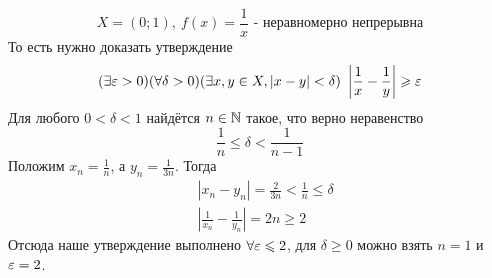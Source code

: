 \begin{example}
	\[
		X = (0; 1),\ f(x) = \frac{1}{x}
		\text{ - неравномерно непрерывна}
	\]
	То есть нужно доказать утверждение
	\[
		(\exists \eps > 0)(\forall \delta > 0)
		(\exists x, y \in X, |x - y| < \delta)\ 
		\left|\frac{1}{x} - \frac{1}{y}\right| \ge \eps
	\]
	Для любого $0 < \delta < 1$ найдётся $n \in \mathbb{N}$ такое,
	что верно неравенство
	\[
		\frac{1}{n} \le \delta < \frac{1}{n - 1}
	\]
	Положим $x_n = \frac{1}{n}$, а $y_n = \frac{1}{3n}$. Тогда
	\begin{align*}
		&{|x_n - y_n| = \frac{2}{3n} < \frac{1}{n} \le \delta}
		\\
		&{\left|\frac{1}{x_n} - \frac{1}{y_n}\right| = 2n \ge 2}
	\end{align*}
	Отсюда наше утверждение выполнено $\forall \varepsilon \leqslant 2$,
	для $\delta \ge 0$ можно взять $n = 1$ и
	$\varepsilon = 2$.
\end{example}